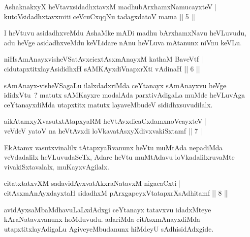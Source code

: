 
\begin{shl}
AshaknakxyX heVtavxsidadhxtavxM madhubArxhamxNamucayxteV |\\
kutoV\s sidadhxtavxmiti ceVcuCxqqNu tadagxdatoV mama \hfill || 5 ||
\end{shl}

\begin{artha}
I heVtuvu asidadhxveMdu AshaMke mADi madhu bArxhamxNavu heVLuvudu, adu heVge asidadhxveMdu keVLidare nAnu heVLuva mAtanunx niVnu keVLu.
\end{artha}

\begin{shl}
niHsAmAnayxvisheVSatAvxcicxtAsxmAnayxM kathaM BaveVtf |\\
cidutapxtitxlayAsididhxH sAMKAyxdiVnapxrXti vAdinaH \hfill || 6 ||
\end{shl}

\begin{artha}
sAmAnayx-visheVSagaLu ilalxdadxriMda ceYtanayx sAmAnayxvu heVge ididxVtu~? matutx sAMKayxre modalAda parxtivAdigaLa muMde heVLuvAga ceYtanayxdiMda utapxtitx matutx layaveMbudeV sididhxsuvudilalx.
\end{artha}

\begin{shl}
aikAtamxyXvasutxtAtapxyaRM heVtAvxdicaCxdamxnoVcayxteV |\\
veVdeV yatoV na heVtAvxdi loVkavatAsxyXdivxvakiSxtamf \hfill || 7 ||
\end{shl}

\begin{artha}
EkAtamx vasutxvinalilx tAtapxyaRvanunx heVtu muMtAda nepadiMda veVdadalilx heVLuvudaSeTx, Adare heVtu muMtAdavu loVkadalilxruvaMte vivakiSxtavalalx, muKayxvAgilalx.
\end{artha}

\begin{shl}
citatxtatxvXM sadavidAyxvatAkxraNatavxM nigacaCxti |\\
citAsxmAnAyxdayxtaH sidadhxM pArxgapeyxVtatapxrXsAdhitamf \hfill || 8 ||
\end{shl}

\begin{artha}
avidAyxsaMbaMdhavuLaLxdAdxgi ceYtanayx tatavxvu idadxMteye kAraNatavxvanunx hoMduvudu. adariMda citAsxmAnayxdiMda utapxtitxlayAdigaLu AgiveyeMbudanunx hiMdeyU sAdhisidAdxgide.
\end{artha}

